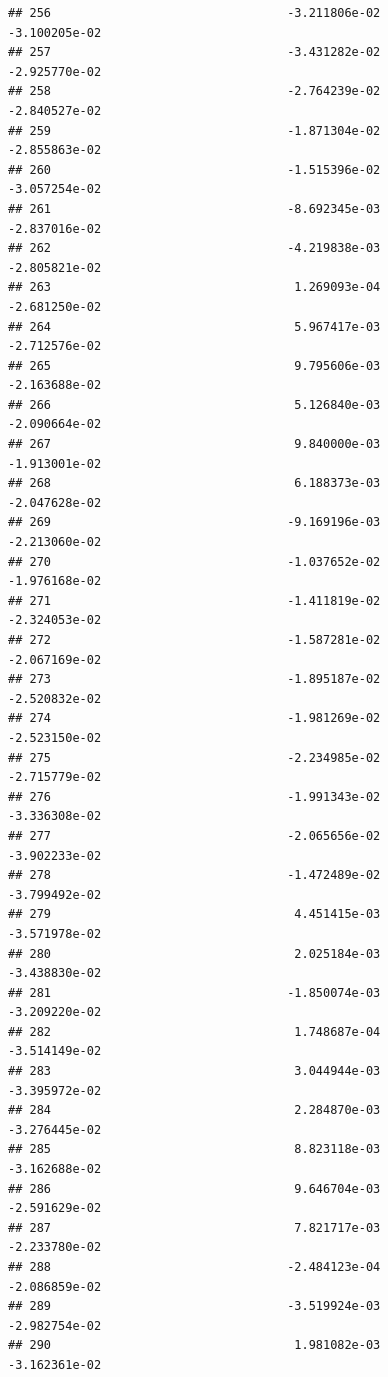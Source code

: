 \documentclass[
]{article}
\begin{document}
\begin{verbatim}
## 256                                 -3.211806e-02          -3.100205e-02
## 257                                 -3.431282e-02          -2.925770e-02
## 258                                 -2.764239e-02          -2.840527e-02
## 259                                 -1.871304e-02          -2.855863e-02
## 260                                 -1.515396e-02          -3.057254e-02
## 261                                 -8.692345e-03          -2.837016e-02
## 262                                 -4.219838e-03          -2.805821e-02
## 263                                  1.269093e-04          -2.681250e-02
## 264                                  5.967417e-03          -2.712576e-02
## 265                                  9.795606e-03          -2.163688e-02
## 266                                  5.126840e-03          -2.090664e-02
## 267                                  9.840000e-03          -1.913001e-02
## 268                                  6.188373e-03          -2.047628e-02
## 269                                 -9.169196e-03          -2.213060e-02
## 270                                 -1.037652e-02          -1.976168e-02
## 271                                 -1.411819e-02          -2.324053e-02
## 272                                 -1.587281e-02          -2.067169e-02
## 273                                 -1.895187e-02          -2.520832e-02
## 274                                 -1.981269e-02          -2.523150e-02
## 275                                 -2.234985e-02          -2.715779e-02
## 276                                 -1.991343e-02          -3.336308e-02
## 277                                 -2.065656e-02          -3.902233e-02
## 278                                 -1.472489e-02          -3.799492e-02
## 279                                  4.451415e-03          -3.571978e-02
## 280                                  2.025184e-03          -3.438830e-02
## 281                                 -1.850074e-03          -3.209220e-02
## 282                                  1.748687e-04          -3.514149e-02
## 283                                  3.044944e-03          -3.395972e-02
## 284                                  2.284870e-03          -3.276445e-02
## 285                                  8.823118e-03          -3.162688e-02
## 286                                  9.646704e-03          -2.591629e-02
## 287                                  7.821717e-03          -2.233780e-02
## 288                                 -2.484123e-04          -2.086859e-02
## 289                                 -3.519924e-03          -2.982754e-02
## 290                                  1.981082e-03          -3.162361e-02

\end{verbatim}
\end{document}
